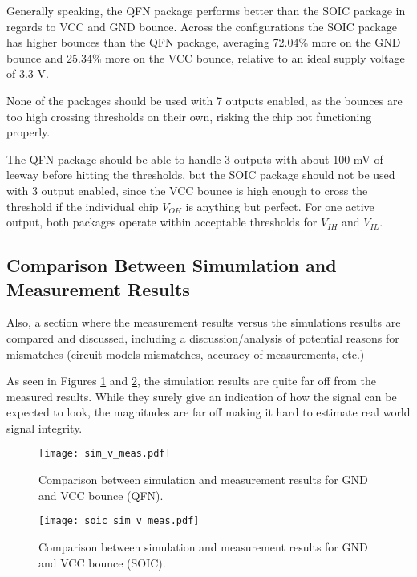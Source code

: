 \documentclass[../main.tex]{subfiles}
\begin{document}
\solution

Generally speaking, the QFN package performs better than the SOIC package in regards to VCC and GND bounce. Across the configurations the SOIC package has higher bounces than the QFN package, averaging 72.04\% more on the GND bounce and 25.34\% more on the VCC bounce, relative to an ideal supply voltage of 3.3 V. 

None of the packages should be used with 7 outputs enabled, as the bounces are too high crossing thresholds on their own, risking the chip not functioning properly. 

The QFN package should be able to handle 3 outputs with about 100 mV of leeway before hitting the thresholds, but the SOIC package should not be used with 3 output enabled, since the VCC bounce is high enough to cross the threshold if the individual chip $V_{OH}$ is anything but perfect. For one active output, both packages operate within acceptable thresholds for $V_{IH}$ and $V_{IL}$. 


\newpage

\subsection{Comparison Between Simumlation and Measurement Results}

Also, a section where the measurement results versus the simulations results are compared and discussed, including a discussion/analysis of potential reasons for mismatches (circuit models mismatches, accuracy of measurements, etc.)

\solution

As seen in Figures \ref{fig:sim_v_meas} and \ref{fig:soic-sim_v_meas}, the simulation results are quite far off from the measured results. While they surely give an indication of how the signal can be expected to look, the magnitudes are far off making it hard to estimate real world signal integrity.

\begin{figure}[h]
    \centering
    \texttt{[image: sim\_v\_meas.pdf]}
    \caption{Comparison between simulation and measurement results for GND and VCC bounce (QFN).}
    \label{fig:sim_v_meas}
\end{figure}

\begin{figure}[h]
    \centering
    \texttt{[image: soic\_sim\_v\_meas.pdf]}
    \caption{Comparison between simulation and measurement results for GND and VCC bounce (SOIC).}
    \label{fig:soic-sim_v_meas}
\end{figure}
\end{document}
